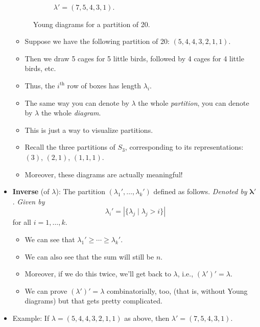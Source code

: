 \documentclass[../notes.tex]{subfiles}
\begin{document}
\begin{itemize}
\begin{figure}[h!]
\begin{subfigure}[b]{0.3\linewidth}
            \centering
            \caption{$\lambda'=(7,5,4,3,1)$.}
            \label{fig:youngDiagram20b}
        \end{subfigure}
        \caption{Young diagrams for a partition of 20.}
        \label{fig:youngDiagram20}
    \end{figure}
    \begin{itemize}
        \item Suppose we have the following partition of 20: $(5,4,4,3,2,1,1)$.
        \item Then we draw 5 cages for 5 little birds, followed by 4 cages for 4 little birds, etc.
        \item Thus, the $i^\text{th}$ row of boxes has length $\lambda_i$.
        \item The same way you can denote by $\lambda$ the whole \emph{partition}, you can denote by $\lambda$ the whole \emph{diagram}.
        \item This is just a way to visualize partitions.
        \item Recall the three partitions of $S_3$, corresponding to its representations: $(3)$, $(2,1)$, $(1,1,1)$.
        \item Moreover, these diagrams are actually meaningful!
    \end{itemize}
    \item \textbf{Inverse} (of $\lambda$): The partition $(\lambda_1',\dots,\lambda_k')$ defined as follows. \emph{Denoted by} $\bm{\lambda'}$. \emph{Given by}
    \begin{equation*}
        \lambda_i' = |\{\lambda_j\mid\lambda_j>i\}|
    \end{equation*}
    for all $i=1,\dots,k$.
    \begin{itemize}
        \item We can see that $\lambda_1'\geq\cdots\geq\lambda_k'$.
        \item We can also see that the sum will still be $n$.
        \item Moreover, if we do this twice, we'll get back to $\lambda$, i.e., $(\lambda')'=\lambda$.
        \item We can prove $(\lambda')'=\lambda$ combinatorially, too, (that is, without Young diagrams) but that gets pretty complicated.
    \end{itemize}
    \item Example: If $\lambda=(5,4,4,3,2,1,1)$ as above, then $\lambda'=(7,5,4,3,1)$.
    \begin{itemize}

\end{itemize}
\end{itemize}
\end{document}

